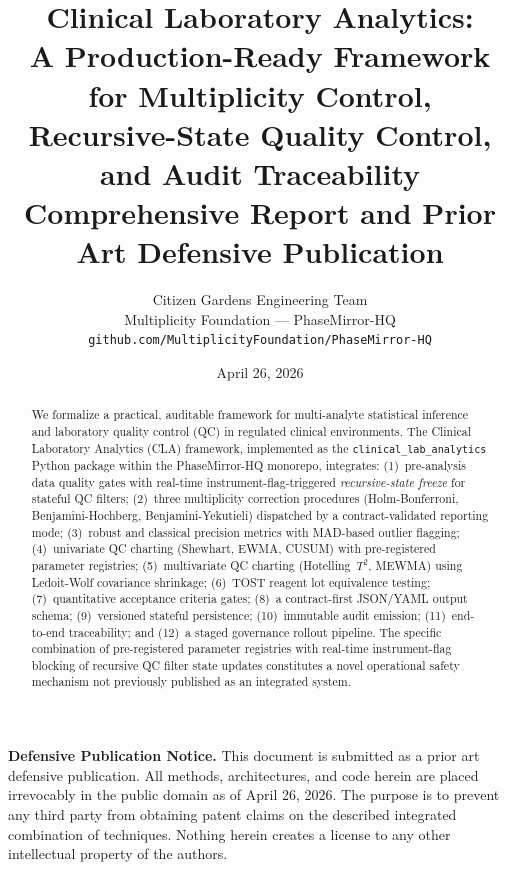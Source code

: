\documentclass[11pt,a4paper]{article}
\title{%
  \LARGE\bfseries Clinical Laboratory Analytics:\\
  A Production-Ready Framework for Multiplicity Control,\\
  Recursive-State Quality Control, and Audit Traceability\\[0.6em]
  \large\normalfont Comprehensive Report and Prior Art Defensive Publication
}
\author{%
  Citizen Gardens Engineering Team\\
  \small Multiplicity Foundation --- PhaseMirror-HQ\\
  \small\texttt{github.com/MultiplicityFoundation/PhaseMirror-HQ}
}
\date{April 26, 2026}
\begin{document}
\maketitle
\thispagestyle{fancy}

\begin{warnenv}
\textbf{Defensive Publication Notice.}
This document is submitted as a prior art defensive publication. All methods,
architectures, and code herein are placed irrevocably in the public domain as
of April 26, 2026. The purpose is to prevent any third party from obtaining
patent claims on the described integrated combination of techniques. Nothing
herein creates a license to any other intellectual property of the authors.
\end{warnenv}

\vspace{4pt}

\begin{abstract}
We formalize a practical, auditable framework for multi-analyte statistical
inference and laboratory quality control (QC) in regulated clinical
environments. The Clinical Laboratory Analytics (CLA) framework, implemented
as the \texttt{clinical\_lab\_analytics} Python package within the
PhaseMirror-HQ monorepo, integrates: (1)~pre-analysis data quality gates with
real-time instrument-flag-triggered \emph{recursive-state freeze} for stateful
QC filters; (2)~three multiplicity correction procedures (Holm-Bonferroni,
Benjamini-Hochberg, Benjamini-Yekutieli) dispatched by a contract-validated
reporting mode; (3)~robust and classical precision metrics with MAD-based
outlier flagging; (4)~univariate QC charting (Shewhart, EWMA, CUSUM) with
pre-registered parameter registries; (5)~multivariate QC charting
(Hotelling~$T^2$, MEWMA) using Ledoit-Wolf covariance shrinkage; (6)~TOST
reagent lot equivalence testing; (7)~quantitative acceptance criteria gates;
(8)~a contract-first JSON/YAML output schema; (9)~versioned stateful
persistence; (10)~immutable audit emission; (11)~end-to-end traceability; and
(12)~a staged governance rollout pipeline. The specific combination of
pre-registered parameter registries with real-time instrument-flag blocking of
recursive QC filter state updates constitutes a novel operational safety
mechanism not previously published as an integrated system.
\end{abstract}
\newpage
\tableofcontents
\newpage
\end{document}

